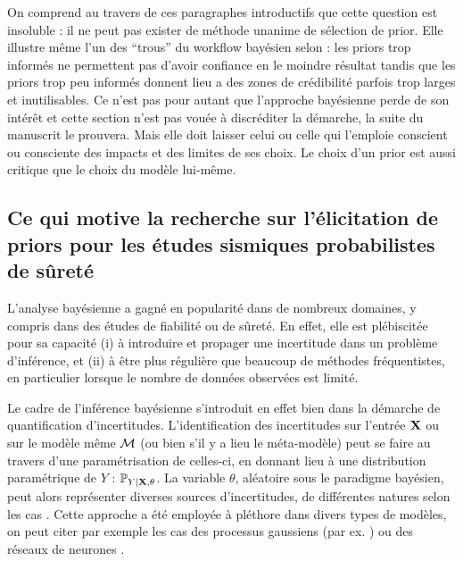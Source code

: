 On comprend au travers de ces paragraphes introductifs que cette question est insoluble : il ne peut pas exister de méthode unanime de sélection de prior. Elle illustre même l'un des ``trous'' du workflow bayésien selon \citet{gelman_holes_2020} : les priors trop informés ne permettent pas d'avoir confiance en le moindre résultat tandis que les priors trop peu informés %
donnent lieu a des zones de crédibilité parfois trop larges et inutilisables.
Ce n'est pas pour autant que l'approche bayésienne perde de son intérêt et cette section n'est pas vouée à discréditer la démarche, la suite du manuscrit le prouvera. %
Mais elle doit laisser celui ou celle qui l'emploie conscient ou consciente des impacts et des limites de ses choix. Le choix d'un prior est aussi critique que le choix du modèle lui-même.














\subsection{Ce qui motive la recherche sur l'élicitation de priors pour les études sismiques probabilistes de sûreté}

L'analyse bayésienne a gagné en popularité dans de nombreux domaines, y compris dans des études de fiabilité ou de sûreté. 
En effet, elle est plébiscitée pour sa capacité (i) à introduire et propager une incertitude dans un problème d'inférence, et (ii) à être plus régulière que beaucoup de méthodes fréquentistes, en particulier lorsque le nombre de données observées est limité.

Le cadre de l'inférence bayésienne s'introduit en effet bien dans la démarche de quantification d'incertitu\-des. 
L'identification des incertitudes sur l'entrée $\mathbf{X}$ ou sur le modèle même $\mathcal{M}$ (ou bien s'il y a lieu le méta-modèle) peut se faire au travers d'une paramétrisation de celles-ci, en donnant lieu à une distribution paramétrique de $Y$ : $\mathbb{P}_{Y|\mathbf{X},\theta}$.
La variable $\theta$, aléatoire sous le paradigme bayésien, peut alors représenter diverses sources d'incertitudes, de différentes natures selon les cas \citep{bousquet_contributions_2024}. Cette approche a été employée à pléthore dans divers types de modèles, on peut citer par exemple les cas des processus gaussiens (par ex. \cite{gu_parallel_2016}) ou des réseaux de neurones \citep{arbel_bayes_2023}. 



